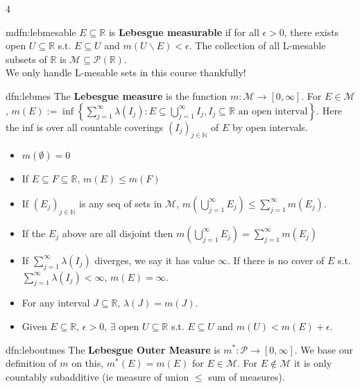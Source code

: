 \documentclass[landscape, 8pt]{extarticle}
\begin{document}
\begin{multicols*}{4}
		
		\begin{mdfn}{mdfn:lebmesable}{ }
			$E \subseteq \mathbb{R}$ is \textbf{Lebesgue measurable} if for all $\epsilon > 0$, there exists open $U \subseteq \mathbb{R}$ s.t. $E \subseteq U$ and $m(U \backslash E) <\epsilon$. The collection of all L-mesable subsets of $\mathbb{R}$ is $\mathcal{M} \subseteq \mathcal{P}(\mathbb{R})$.\\
			We only handle L-mesable sets in this course thankfully!
			
		\end{mdfn}
		
		\begin{mdfn}{dfn:lebmes}{ }
			The \textbf{Lebesgue measure} is the function $m : \mathcal{M} \to [0, \infty]$. For $E\in \mathcal{M}$, $m(E) := \inf \left\{\sum_{j=1}^{\infty}\lambda(I_j) : E \subseteq\bigcup_{j=1}^\infty I_j, I_j \subseteq \mathbb{R} \text{ an open interval}\right\}$. Here the inf is over all countable coverings $(I_j)_{j\in \mathbb{N}}$ of $E$ by open intervals.
			\begin{itemize}
				\item[*] $m(\emptyset) = 0$
				\item[*] If $E \subseteq F \subseteq \mathbb{R}$, $m(E) \le m(F)$
				\item[*] If $(E_j)_{j\in \mathbb{N}}$ is any seq of sets in $\mathcal{M}$, $m\left(\bigcup_{j=1}^{\infty} E_j\right) \le \sum_{j=1}^{\infty}m(E_j)$.
				\item[*] If the $E_j$ above are all disjoint then $m\left(\bigcup_{j=1}^{\infty} E_j\right) = \sum_{j=1}^{\infty}m(E_j)$
				\item If $\sum_{j=1}^{\infty}\lambda(I_j)$ diverges, we say it has value $\infty$. If there is no cover of $E$ s.t. $\sum_{j=1}^{\infty}\lambda(I_j) < \infty$, $m(E) = \infty$.
				\item For any interval $J \subseteq\mathbb{R}$, $\lambda(J) = m(J)$.
				\item Given $E \subseteq\mathbb{R}$, $\epsilon > 0$, $\exists$ open $U \subseteq \mathbb{R}$ s.t. $E \subseteq U$ and $m(U) < m(E) +\epsilon$.
			\end{itemize}
			
		\end{mdfn}
		
		
		\begin{dfn}{dfn:leboutmes}{ }
			The \textbf{Lebesgue Outer Measure} is $m^* : \mathcal{P} \to [0, \infty]$. We base our definition of $m$ on this, $m^*(E) = m(E)$ for $E\in \mathcal{M}$. For $E \notin \mathcal{M}$ it is only countably subadditive (ie measure of union $\le$ sum of measures).
			

\end{dfn}
\end{multicols*}
\end{document}
